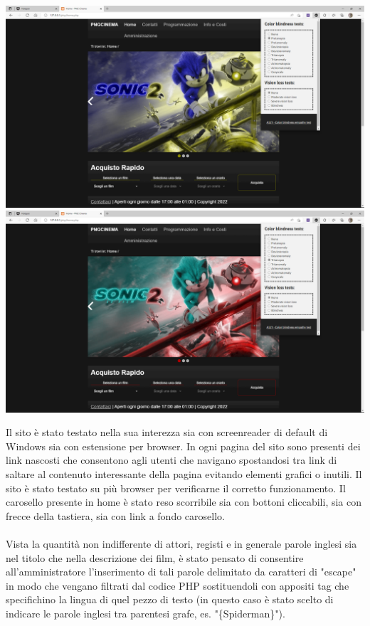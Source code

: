 \documentclass[a4paper, 12pt]{article}
\begin{document}
\begin{center}
    \includegraphics[scale=0.1]{protanopia}
    \includegraphics[scale=0.1]{tritanopia}
\end{center}

Il sito è stato testato nella sua interezza sia con screenreader di default di Windows sia con estensione per browser.
In ogni pagina del sito sono presenti dei link nascosti che consentono agli utenti che navigano spostandosi tra link di saltare al contenuto interessante della pagina evitando elementi grafici o inutili.
Il sito è stato testato su più browser per verificarne il corretto funzionamento.
Il carosello presente in home è stato reso scorribile sia con bottoni cliccabili, sia con frecce della tastiera, sia con link a fondo carosello.
\\\\
Vista la quantità non indifferente di attori, registi e in generale parole inglesi sia nel titolo che nella descrizione dei film, è stato pensato di consentire all'amministratore l'inserimento di tali parole delimitato da caratteri di "escape" in modo che vengano filtrati dal codice PHP sostituendoli con appositi tag che specifichino la lingua di quel pezzo di testo (in questo caso è stato scelto di indicare le parole inglesi tra parentesi grafe, es. "\{Spiderman\}").
\end{document}
